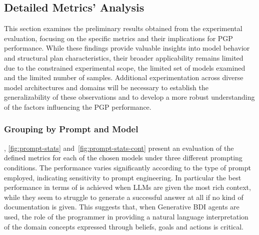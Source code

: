 \documentclass[12pt,a4paper,openright,twoside]{book}
\begin{document}




\subsection{Detailed Metrics' Analysis}\label{sec:metrics-analysis}

This section examines the preliminary results obtained from the experimental evaluation, focusing on the specific metrics and their implications for \ac{PGP} performance.
%
While these findings provide valuable insights into model behavior and structural plan characteristics, their broader applicability remains limited due to the constrained experimental scope, the limited set of models examined and the limited number of samples.
%
Additional experimentation across diverse model architectures and domains will be necessary to establish the generalizability of these observations and to develop a more robust understanding of the factors influencing the \ac{PGP} performance.

\subsubsection{Grouping by Prompt and Model}

, \cref{fig:prompt-stats} and~\cref{fig:prompt-stats-cont} present an evaluation of the defined metrics for each of the chosen models under three different prompting conditions.
%
The performance varies significantly according to the type of prompt employed, indicating sensitivity to prompt engineering.
%
In particular the best performance in terms of \TSR{} is achieved when \acp{LLM} are given the most rich context, while they seem to struggle to generate a successful answer at all if no kind of documentation is given.
%
This suggests that, when Generative \ac{BDI} agents are used, the role of the programmer in providing a natural language interpretation of the domain concepts expressed through beliefs, goals and actions is critical.
\end{document}
